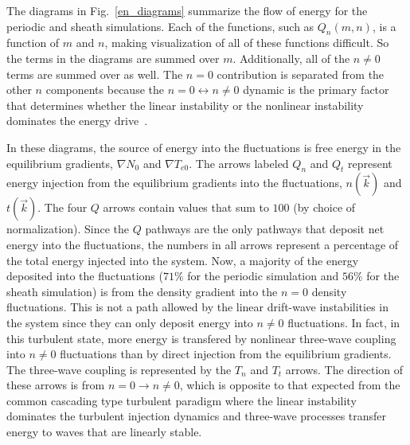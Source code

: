 \documentclass[showpacs,preprintnumbers,amsmath,amssymb,superscriptaddress,aip]{revtex4-1}
\begin{document}
The diagrams in Fig.~\ref{en_diagrams} summarize the flow of energy for the periodic and sheath simulations. Each of the functions, such as $Q_n(m,n)$, is a function of $m$ and $n$, making
visualization of all of these functions difficult. So the terms in the diagrams are summed over $m$. Additionally, all of the $n \ne 0$ terms are summed over as well.
The $n=0$ contribution is separated from the other $n$ components because
the $n=0 \leftrightarrow n \ne 0$ dynamic is the primary factor that determines whether the linear instability or the nonlinear instability dominates the energy drive~\cite{friedman2012b}.

In these diagrams, the source of energy into the fluctuations is free energy in the equilibrium gradients, 
$\nabla N_0$ and $\nabla T_{e0}$. The arrows labeled $Q_n$ and $Q_t$ represent energy injection from
the equilibrium gradients into the fluctuations, $n(\vec{k})$ and $t(\vec{k})$. The four $Q$ arrows contain values that sum to $100$ (by choice of normalization). 
Since the $Q$ pathways are the only pathways that deposit
net energy into the fluctuations, the numbers in all arrows represent a percentage of the total energy injected into the system.
Now, a majority of the energy deposited into the fluctuations ($71\%$
for the periodic simulation and $56\%$ for the sheath simulation)
is from the density gradient into the $n=0$ density fluctuations. This is not a path allowed by the linear drift-wave instabilities in the system since
they can only deposit energy into $n \ne 0$ fluctuations.
In fact, in this turbulent state, more energy is transfered by nonlinear three-wave coupling into $n \ne 0$ fluctuations than by direct injection from the equilibrium gradients. The three-wave
coupling is represented by the $T_n$ and $T_t$ arrows. The direction of these arrows is from $n=0 \rightarrow n \ne 0$, which is opposite to that expected from the common cascading type 
turbulent paradigm where the linear instability dominates the turbulent injection dynamics and three-wave processes transfer energy to waves that are linearly stable.
\end{document}
